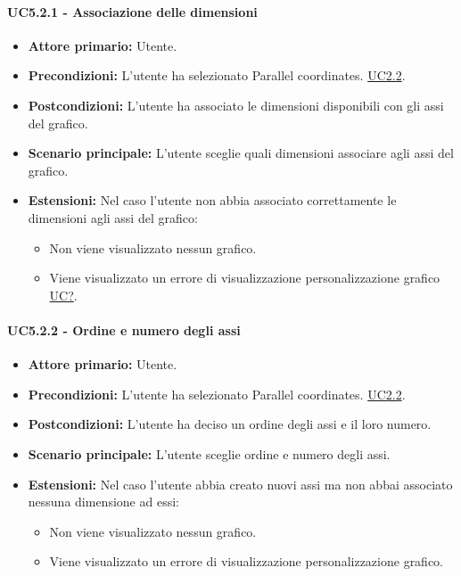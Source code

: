\paragraph{UC5.2.1 - Associazione delle dimensioni}
\label{sec:UC5.2.1}
    \begin{itemize}
        \item \textbf{Attore primario:} Utente.
        \item \textbf{Precondizioni:} L'utente ha selezionato Parallel coordinates. \hyperref[sec:UC2.2]{UC2.2}.
	    \item \textbf{Postcondizioni:} L'utente ha associato le dimensioni disponibili con gli assi del grafico.
	    \item \textbf{Scenario principale:} L'utente sceglie quali dimensioni associare agli assi del grafico.
	    \item \textbf{Estensioni:} Nel caso l'utente non abbia associato correttamente le dimensioni agli assi del grafico:
              \begin{itemize}
                  \item Non viene visualizzato nessun grafico.
                  \item Viene visualizzato un errore di visualizzazione personalizzazione grafico \hyperref[sec:UC - Errore di personalizzazione]{UC?}.
              \end{itemize}
    \end{itemize}
\paragraph{UC5.2.2 - Ordine e numero degli assi}
\label{sec:UC5.2.2}
    \begin{itemize}
        \item \textbf{Attore primario:} Utente.
        \item \textbf{Precondizioni:} L'utente ha selezionato Parallel coordinates. \hyperref[sec:UC2.2]{UC2.2}.
	    \item \textbf{Postcondizioni:} L'utente ha deciso un ordine degli assi e il loro numero.
	    \item \textbf{Scenario principale:} L'utente sceglie ordine e numero degli assi.
	    \item \textbf{Estensioni:} Nel caso l'utente abbia creato nuovi assi ma non abbai associato nessuna dimensione ad essi:
              \begin{itemize}
                  \item Non viene visualizzato nessun grafico.
                  \item Viene visualizzato un errore di visualizzazione personalizzazione grafico.
              \end{itemize}
    \end{itemize}


